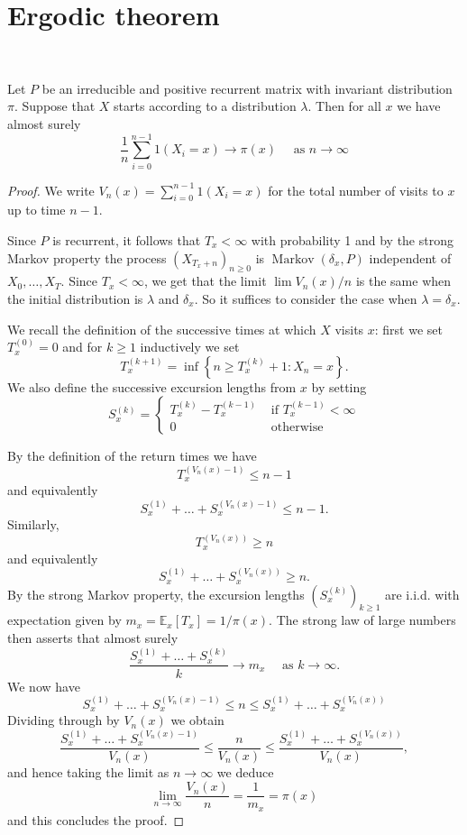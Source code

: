 \documentclass[a4paper,11pt]{article}
\begin{document}
\section{Ergodic theorem}\ \vspace{-1.5em}
\begin{theorem}\label{thm:Ergodic theorem}
    Let $P$ be an irreducible and positive recurrent matrix with invariant distribution $\pi$. Suppose that $X$ starts according to a distribution $\lambda$. Then for all $x$ we have almost surely
\[
\frac{1}{n} \sum_{i=0}^{n-1} 1\left(X_i=x\right) \rightarrow \pi(x) \quad \text { as } n \rightarrow \infty
\]
\end{theorem}
\begin{proof}
    We write $V_n(x)=\sum_{i=0}^{n-1} 1\left(X_i=x\right)$ for the total number of visits to $x$ up to time $n-1$.

Since $P$ is recurrent, it follows that $T_x<\infty$ with probability 1 and by the strong Markov property the process $\left(X_{T_x+n}\right)_{n \geq 0}$ is $\operatorname{Markov}\left(\delta_x, P\right)$ independent of $X_0, \ldots, X_T$. Since $T_x<\infty$, we get that the limit $\lim V_n(x) / n$ is the same when the initial distribution is $\lambda$ and $\delta_x$. So it suffices to consider the case when $\lambda=\delta_x$.

We recall the definition of the successive times at which $X$ visits $x$: first we set $T_x^{(0)}=0$ and for $k \geq 1$ inductively we set
\[
T_x^{(k+1)}=\inf \left\{n \geq T_x^{(k)}+1: X_n=x\right\} .
\]
We also define the successive excursion lengths from $x$ by setting
\[
S_x^{(k)}= \begin{cases}T_x^{(k)}-T_x^{(k-1)} & \text { if } T_x^{(k-1)}<\infty \\ 0 & \text { otherwise }\end{cases}
\]

By the definition of the return times we have
\[
T_x^{\left(V_n(x)-1\right)} \leq n-1
\]
and equivalently
\[
S_x^{(1)}+\ldots+S_x^{\left(V_n(x)-1\right)} \leq n-1 .
\]
Similarly,
\[
T_x^{\left(V_n(x)\right)} \geq n
\]
and equivalently
\[
S_x^{(1)}+\ldots+S_x^{\left(V_n(x)\right)} \geq n .
\]
By the strong Markov property, the excursion lengths $\left(S_x^{(k)}\right)_{k \geq 1}$ are i.i.d. with expectation given by $m_x=\mathbb{E}_x\left[T_x\right]=1 / \pi(x)$. The strong law of large numbers then asserts that almost surely
\[
\frac{S_x^{(1)}+\ldots+S_x^{(k)}}{k} \rightarrow m_x \quad \text { as } k \rightarrow \infty .
\]
We now have
\[
S_x^{(1)}+\ldots+S_x^{\left(V_n(x)-1\right)} \leq n \leq S_x^{(1)}+\ldots+S_x^{\left(V_n(x)\right)}
\]
Dividing through by $V_n(x)$ we obtain
\[
\frac{S_x^{(1)}+\ldots+S_x^{\left(V_n(x)-1\right)}}{V_n(x)} \leq \frac{n}{V_n(x)} \leq \frac{S_x^{(1)}+\ldots+S_x^{\left(V_n(x)\right)}}{V_n(x)},
\]
and hence taking the limit as $n \rightarrow \infty$ we deduce
\[
\lim _{n \rightarrow \infty} \frac{V_n(x)}{n}=\frac{1}{m_x}=\pi(x)
\]
and this concludes the proof.
\end{proof}
\end{document}

